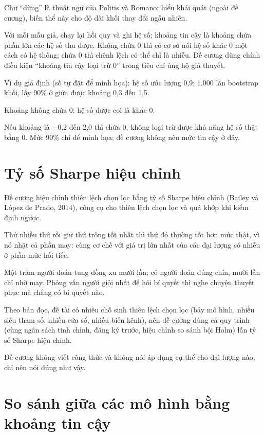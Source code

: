 Chữ “dừng” là thuật ngữ của Politis và Romano; hiểu khái quát (ngoài đề cương), biến thể này cho độ dài khối thay đổi ngẫu nhiên.

Với mỗi mẫu giả, chạy lại hồi quy và ghi hệ số; khoảng tin cậy là khoảng chứa phần lớn các hệ số thu được. Không chứa 0 thì có cơ sở nói hệ số khác 0 một cách có hệ thống; chứa 0 thì chênh lệch có thể chỉ là nhiễu. Đề cương dùng chính điều kiện “khoảng tin cậy loại trừ 0” trong tiêu chí ủng hộ giả thuyết.

\begin{tcolorbox}[breakable]
Ví dụ giả định (số tự đặt để minh họa): hệ số ước lượng 0,9; 1.000 lần bootstrap khối, lấy 90\% ở giữa được khoảng 0,3 đến 1,5.

Khoảng không chứa 0: hệ số được coi là khác 0.

Nếu khoảng là −0,2 đến 2,0 thì chứa 0, không loại trừ được khả năng hệ số thật bằng 0. Mức 90\% chỉ để minh họa; đề cương không nêu mức tin cậy ở đây.
\end{tcolorbox}

\section{Tỷ số Sharpe hiệu chỉnh}

Đề cương hiệu chỉnh thiên lệch chọn lọc bằng tỷ số Sharpe hiệu chỉnh (Bailey và López de Prado, 2014), công cụ cho thiên lệch chọn lọc và quá khớp khi kiểm định ngược.

Thử nhiều thứ rồi giữ thứ trông tốt nhất thì thứ đó thường tốt hơn mức thật, vì nó nhặt cả phần may: cùng cơ chế với giá trị lớn nhất của các đại lượng có nhiễu ở phần mức hối tiếc.

Một trăm người đoán tung đồng xu mười lần; có người đoán đúng chín, mười lần chỉ nhờ may. Phỏng vấn người giỏi nhất để hỏi bí quyết thì nghe chuyện thuyết phục mà chẳng có bí quyết nào.

Theo bản đọc, đề tài có nhiều chỗ sinh thiên lệch chọn lọc (bảy mô hình, nhiều siêu tham số, nhiều cửa sổ, nhiều biến kênh), nên đề cương dùng cả quy trình (cùng ngân sách tinh chỉnh, đăng ký trước, hiệu chỉnh so sánh bội Holm) lẫn tỷ số Sharpe hiệu chỉnh.

Đề cương không viết công thức và không nói áp dụng cụ thể cho đại lượng nào; chỉ nên nói đúng như vậy.

\section{So sánh giữa các mô hình bằng khoảng tin cậy}

